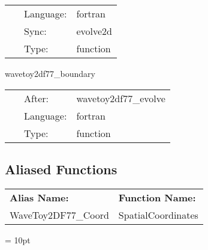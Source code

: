 \hspace{5mm}{\it evolution of 2d wave equation } 


\hspace{5mm}

 \begin{tabular*}{160mm}{cll} 
~ & Language:  & fortran \\ 
~ & Sync:  & evolve2d \\ 
~ & Type:  & function \\ 
\end{tabular*} 


\vspace{5mm}


\hspace{5mm} wavetoy2df77\_boundary 

\hspace{5mm}{\it apply boundary conditions } 


\hspace{5mm}

 \begin{tabular*}{160mm}{cll} 
~ & After:  & wavetoy2df77\_evolve \\ 
~ & Language:  & fortran \\ 
~ & Type:  & function \\ 
\end{tabular*} 


\subsection*{Aliased Functions}

\hspace{5mm}

 \begin{tabular*}{160mm}{ll} 

{\bf Alias Name:} ~~~~~~~ & {\bf Function Name:} \\ 
WaveToy2DF77\_Coord & SpatialCoordinates \\ 
\end{tabular*} 



\vspace{5mm}\parskip = 10pt 

